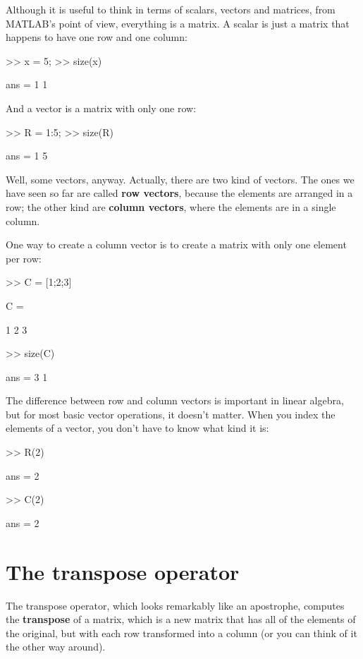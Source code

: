 \documentclass[
]{book}
\numberwithin{Answer}{chapter}
\numberwithin{Exercise}{chapter}
\begin{document}
Although it is useful to think in terms of scalars, vectors and matrices,
from MATLAB's point of view, everything is a matrix.  A scalar
is just a matrix that happens to have one row and one column:

\begin{code}
>> x = 5;
>> size(x)

ans = 1     1
\end{code}

And a vector is a matrix with only one row:

\begin{code}
>> R = 1:5;
>> size(R)

ans = 1     5
\end{code}

Well, some vectors, anyway.  Actually, there are two kind
of vectors.  The ones we have seen so far are called {\bf row vectors},
because the elements are arranged in a row; the other kind are
{\bf column vectors}, where the elements are in a single column.

One way to create a column vector is to create a matrix with only
one element per row:

\begin{code}
>> C = [1;2;3]

C =

     1
     2
     3

>> size(C)

ans = 3     1
\end{code}

The difference between row and column vectors is important in
linear algebra, but for most basic vector operations, it doesn't matter.  When you index the elements of a vector, you don't have to know what kind
it is:


\begin{code}
>> R(2)

ans = 2

>> C(2)

ans = 2
\end{code}



\section{The transpose operator}

The transpose operator, which looks remarkably like an apostrophe,
computes the {\bf transpose} of a matrix, which is a new matrix
that has all of the elements of the original, but with each row
transformed into a column (or you can think of it the other way around).
\end{document}
